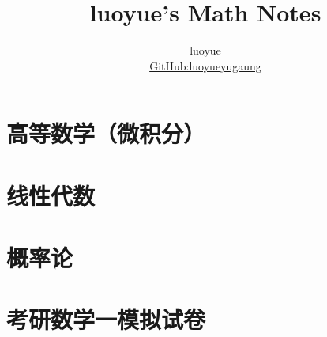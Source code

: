 \documentclass[a4paper,oneside]{ctexbook}
\title{luoyue's Math Notes}
\author{luoyue \\
	\href{https://github.com/luoyueyuguang/}{GitHub:luoyueyugaung}
}
\date{}
\begin{document}
\maketitle

\tableofcontents
\part{高等数学（微积分）}


\part{线性代数}



\part{概率论}


\part{考研数学一模拟试卷}

\end{document}
